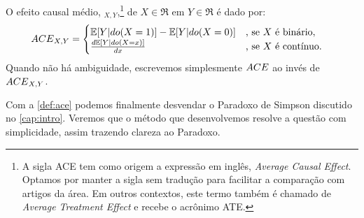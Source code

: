 \begin{definition}
 \label{def:ace}
 O efeito causal médio, \ACE$_{X,Y}$,\footnote{
 A sigla ACE tem como origem a expressão em inglês,
 \textit{Average Causal Effect}. Optamos por manter a sigla 
 sem tradução para facilitar a comparação com artigos da área.
 Em outros contextos, este termo também é chamado de 
 \textit{Average Treatment Effect} e recebe o acrônimo ATE.}
 de $X \in \Re$ em $Y \in \Re$ é dado por:
 \begin{align*}
  {ACE}_{X,Y} &=
  \begin{cases}
   {\mathbb E}[Y|do(X=1)] - {\mathbb E}[Y|do(X=0)]
   & \text{, se $X$ é binário}, \\
   \frac{d{\mathbb E}[Y|do(X=x)]}{dx}
   & \text{, se $X$ é contínuo}.
  \end{cases}
 \end{align*}
 Quando não há ambiguidade, escrevemos simplesmente
 ${ACE}$ ao invés de ${ACE}_{X,Y}$.
\end{definition}

Com a \cref{def:ace} podemos finalmente desvendar
o Paradoxo de Simpson discutido no \cref{cap:intro}.
Veremos que o método que desenvolvemos resolve
a questão com simplicidade,
assim trazendo clareza ao Paradoxo.


